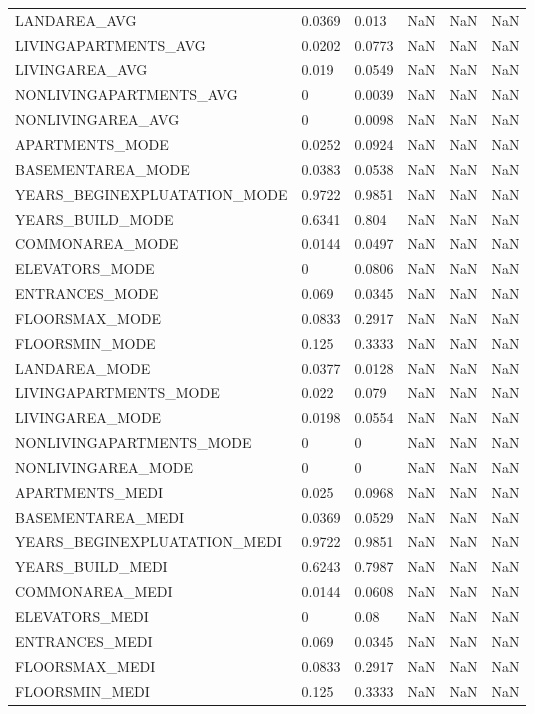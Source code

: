 \documentclass[12pt, letterpaper]{article}
\begin{document}
\begin{appendices}
{\begin{longtable}[c]{| l || p{2cm} | p{2cm} | p{2cm} | p{2cm} | p{2cm} |}
LANDAREA_AVG	&	0.0369	&	0.013	&	NaN	&	NaN	&	NaN	\\
LIVINGAPARTMENTS_AVG	&	0.0202	&	0.0773	&	NaN	&	NaN	&	NaN	\\
LIVINGAREA_AVG	&	0.019	&	0.0549	&	NaN	&	NaN	&	NaN	\\
NONLIVINGAPARTMENTS_AVG	&	0	&	0.0039	&	NaN	&	NaN	&	NaN	\\
NONLIVINGAREA_AVG	&	0	&	0.0098	&	NaN	&	NaN	&	NaN	\\
APARTMENTS_MODE	&	0.0252	&	0.0924	&	NaN	&	NaN	&	NaN	\\
BASEMENTAREA_MODE	&	0.0383	&	0.0538	&	NaN	&	NaN	&	NaN	\\
YEARS_BEGINEXPLUATATION_MODE	&	0.9722	&	0.9851	&	NaN	&	NaN	&	NaN	\\
YEARS_BUILD_MODE	&	0.6341	&	0.804	&	NaN	&	NaN	&	NaN	\\
COMMONAREA_MODE	&	0.0144	&	0.0497	&	NaN	&	NaN	&	NaN	\\
ELEVATORS_MODE	&	0	&	0.0806	&	NaN	&	NaN	&	NaN	\\
ENTRANCES_MODE	&	0.069	&	0.0345	&	NaN	&	NaN	&	NaN	\\
FLOORSMAX_MODE	&	0.0833	&	0.2917	&	NaN	&	NaN	&	NaN	\\
FLOORSMIN_MODE	&	0.125	&	0.3333	&	NaN	&	NaN	&	NaN	\\
LANDAREA_MODE	&	0.0377	&	0.0128	&	NaN	&	NaN	&	NaN	\\
LIVINGAPARTMENTS_MODE	&	0.022	&	0.079	&	NaN	&	NaN	&	NaN	\\
LIVINGAREA_MODE	&	0.0198	&	0.0554	&	NaN	&	NaN	&	NaN	\\
NONLIVINGAPARTMENTS_MODE	&	0	&	0	&	NaN	&	NaN	&	NaN	\\
NONLIVINGAREA_MODE	&	0	&	0	&	NaN	&	NaN	&	NaN	\\
APARTMENTS_MEDI	&	0.025	&	0.0968	&	NaN	&	NaN	&	NaN	\\
BASEMENTAREA_MEDI	&	0.0369	&	0.0529	&	NaN	&	NaN	&	NaN	\\
YEARS_BEGINEXPLUATATION_MEDI	&	0.9722	&	0.9851	&	NaN	&	NaN	&	NaN	\\
YEARS_BUILD_MEDI	&	0.6243	&	0.7987	&	NaN	&	NaN	&	NaN	\\
COMMONAREA_MEDI	&	0.0144	&	0.0608	&	NaN	&	NaN	&	NaN	\\
ELEVATORS_MEDI	&	0	&	0.08	&	NaN	&	NaN	&	NaN	\\
ENTRANCES_MEDI	&	0.069	&	0.0345	&	NaN	&	NaN	&	NaN	\\
FLOORSMAX_MEDI	&	0.0833	&	0.2917	&	NaN	&	NaN	&	NaN	\\
FLOORSMIN_MEDI	&	0.125	&	0.3333	&	NaN	&	NaN	&	NaN	\\

\end{longtable}}
\end{appendices}
\end{document}
